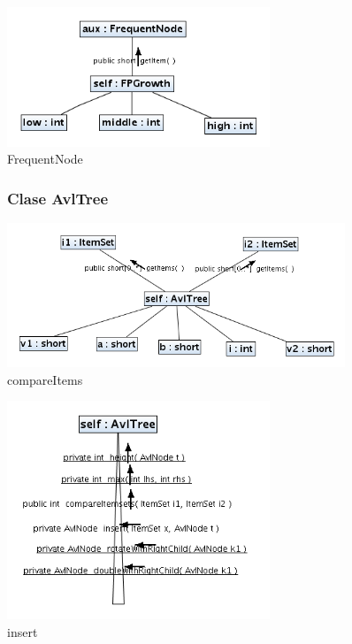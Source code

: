 \newpage
\begin{figure}
\centering
\includegraphics[width=0.7\textwidth]{imgsColaboracion/FPGrowth/FPGrowth/FrequentNode.png}
\caption{FrequentNode}
\end{figure}
\newpage
\begin{figure}
\subsubsection{Clase AvlTree}
\centering
\includegraphics[width=0.9\textwidth]{imgsColaboracion/Utils/AvlTree/compareItems.png}
\caption{compareItems}
\end{figure}
\newpage
\begin{figure}
\centering
\includegraphics[width=0.7\textwidth]{imgsColaboracion/Utils/AvlTree/insert.png}
\caption{insert}
\end{figure}
\newpage

